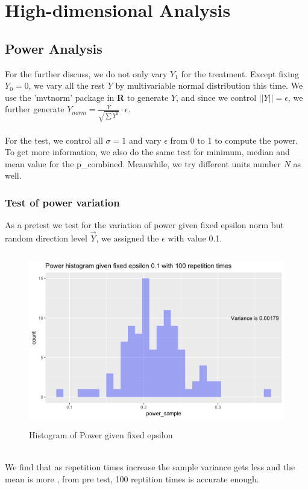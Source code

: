 \documentclass[10pt,english]{article}\usepackage{graphicx, color}
\numberwithin{equation}{section}
\numberwithin{figure}{section}
\begin{document}
\section{High-dimensional Analysis}
\subsection{Power Analysis}
For the further discuss, we do not only vary $Y_1$ for the treatment. Except fixing $Y_0=0$, we vary all the rest $Y$ by multivariable normal distribution this time. We use the 'mvtnorm' package in \textbf{R} to generate $Y$, and since we control $||Y||=\epsilon$, we further generate $Y_{norm}=\frac{Y}{\sqrt{\sum Y^2}}\cdot\epsilon$.\\
\quad\\
For the test, we control all $\sigma=1$ and vary $\epsilon$ from 0 to 1 to compute the power. To get more information, we also do the same test for minimum, median and mean value for the p\_combined. Meanwhile, we try different units number $N$ as well.\\
\subsubsection{Test of power variation}
As a pretest we test for the variation of power given fixed epsilon norm but random direction level $\vec{Y}$, we assigned the $\epsilon$ with value 0.1.\\
\begin{figure}[htbp]
\centering\includegraphics[width=4.5in, height=3in]{histo}
\caption{Histogram of Power given fixed epsilon}
\end{figure}
\quad\\
We find that as repetition times increase the sample variance gets less and the mean is more , from pre test, 100 reptition times is accurate enough.
\newpage
\end{document}
